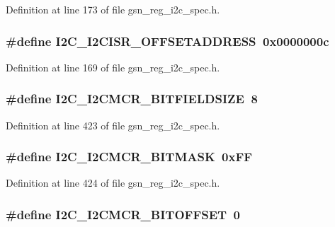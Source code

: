 Definition at line 173 of file gsn\_\-reg\_\-i2c\_\-spec.h.

\hypertarget{a00558_a25ab6eec51f63cc743a9e75a0993bea5}{
\subsubsection[{I2C\_\-I2CISR\_\-OFFSETADDRESS}]{\setlength{\rightskip}{0pt plus 5cm}\#define I2C\_\-I2CISR\_\-OFFSETADDRESS~0x0000000c}}
\label{a00558_a25ab6eec51f63cc743a9e75a0993bea5}


Definition at line 169 of file gsn\_\-reg\_\-i2c\_\-spec.h.

\hypertarget{a00558_a4adb9cde9ded51c176368ce5b38a4d69}{
\subsubsection[{I2C\_\-I2CMCR\_\-BITFIELDSIZE}]{\setlength{\rightskip}{0pt plus 5cm}\#define I2C\_\-I2CMCR\_\-BITFIELDSIZE~8}}
\label{a00558_a4adb9cde9ded51c176368ce5b38a4d69}


Definition at line 423 of file gsn\_\-reg\_\-i2c\_\-spec.h.

\hypertarget{a00558_aa4c89c242e87e88061e58f6a9aa5d545}{
\subsubsection[{I2C\_\-I2CMCR\_\-BITMASK}]{\setlength{\rightskip}{0pt plus 5cm}\#define I2C\_\-I2CMCR\_\-BITMASK~0xFF}}
\label{a00558_aa4c89c242e87e88061e58f6a9aa5d545}


Definition at line 424 of file gsn\_\-reg\_\-i2c\_\-spec.h.

\hypertarget{a00558_ad2fc1819bbd098e1ed0b428feb503939}{
\subsubsection[{I2C\_\-I2CMCR\_\-BITOFFSET}]{\setlength{\rightskip}{0pt plus 5cm}\#define I2C\_\-I2CMCR\_\-BITOFFSET~0}}
\label{a00558_ad2fc1819bbd098e1ed0b428feb503939}


